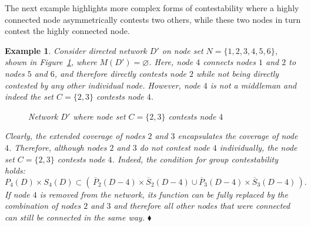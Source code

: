 \documentclass[11pt,fleqn]{article}
\newtheorem{expl}[theorem]{Example}
\newenvironment{example}{\begin{expl} \rm}{\hfill $\blacklozenge$ \end{expl}}{}
\begin{document}
\noindent
The next example highlights more complex forms of contestability where a highly connected node asymmetrically contests two others, while these two nodes in turn contest the highly connected node.

\begin{example} \label{Group Contestability}
Consider directed network $D'$ on node set $N = \{1,2,3,4,5,6\}$, shown in Figure~\ref{Complex Contestability}, where $M(D') = \varnothing$. Here, node $4$ connects nodes $1$ and $2$ to nodes $5$ and $6$, and therefore directly contests node $2$ while not being directly contested by any other individual node. However, node $4$ is not a middleman and indeed the set $ C= \{ 2,3 \}$ contests node $4$.

\begin{figure}[h]
\begin{center}
\caption{Network $D'$ where node set $C = \{ 2,3 \}$ contests node $4$}
\label{Complex Contestability}
\end{center}
\end{figure}

\noindent
Clearly, the extended coverage of nodes $2$ and $3$ encapsulates the coverage of node $4$. Therefore, although nodes $2$ and $3$ do not contest node $4$ individually, the node set $C = \{ 2,3 \}$ contests node $4$. Indeed, the condition for group contestability holds:
\begin{equation}
P_{4}(D) \times S_{4}(D) \subset \left( \, \overline{P}_{2}(D - 4) \times \overline{S}_{2}(D - 4) \cup \overline{P}_{3}(D - 4) \times \overline{S}_{3}(D - 4) \, \right).
\end{equation}
If node $4$ is removed from the network, its function can be fully replaced by the combination of nodes $2$ and $3$ and therefore all other nodes that were connected can still be connected in the same way.
\end{example}
\end{document}
